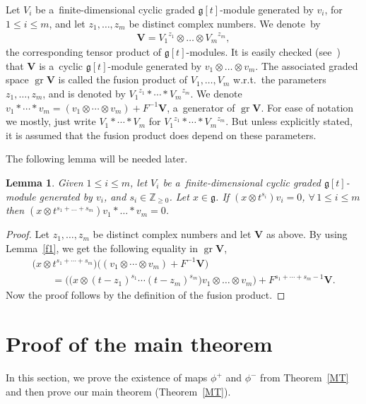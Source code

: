 \documentclass[11pt]{article}
\newtheorem{lemma}{Lemma}
\DeclareMathOperator{\gr}{gr}
\numberwithin{equation}{section}
\begin{document}
Let $V_i$ be a~f\/inite-dimensional cyclic graded $\mathfrak{g}[t]$-module generated by $v_i$, for $1\leq i\leq m$, and
let $z_1,\dots,z_m$ be distinct complex numbers.
We denote~by
\begin{gather*}
\mathbf{V}={V_1}^{z_1}\otimes\dots\otimes {V_m}^{z_m},
\end{gather*}
the corresponding tensor product of $\mathfrak{g}[t]$-modules.
It is easily checked (see~\cite[Proposition 1.4]{FL}) that $\mathbf{V}$ is a~cyclic $\mathfrak{g}[t]$-module generated
by $v_1\otimes\dots\otimes v_m$.
The associated graded space $\gr \mathbf{V}$ is called the fusion product of $V_1,\dots,V_m$ w.r.t.\ the parameters
$z_1,\dots,z_m$, and is denoted by ${V_1}^{z_1}*\cdots*{V_m}^{z_m}$.
We denote $v_1*\cdots*v_m=(v_1\otimes\cdots\otimes v_m)+F^{-1}\mathbf{V}$, a~generator of $\gr \mathbf{V}$.
For ease of notation we mostly, just write $V_1*\cdots*V_m$ for ${V_1}^{z_1}*\cdots*{V_m}^{z_m}$.
But unless explicitly stated, it is assumed that the fusion product does depend on these parameters.

The following lemma will be needed later.
\begin{lemma}
\label{f2}
Given $1\leq i\leq m$, let $V_i$ be a~finite-dimensional cyclic graded $\mathfrak{g}[t]$-module generated by $v_i$, and
$s_i\in\mathbb{Z}_{\geq0}$.
Let $x\in\mathfrak{g}$.
If $(x\otimes t^{s_i})v_i=0$, $\forall\, 1\leq i\leq m$ then $(x\otimes t^{s_1+\dots+s_m}) v_1*\dots*v_m=0$.
\end{lemma}
\begin{proof}
Let $z_1,\dots,z_m$ be distinct complex numbers and let $\mathbf{V}$ as above.
By using Lemma~\ref{f1}, we get the following equality in $\gr \mathbf{V}$,
\begin{gather*}
\big(x\otimes t^{s_1+\cdots+s_m}\big) \big((v_1\otimes\cdots\otimes v_m)+F^{-1}\mathbf{V}\big)
\\
\qquad{}
=\big(\big(x\otimes (t-z_1)^{s_1}\cdots(t-z_m)^{s_m}\big)v_1\otimes\dots\otimes v_m\big) + F^{s_1+\cdots+s_m-1}\mathbf{V}.
\end{gather*}
Now the proof follows by the def\/inition of the fusion product.
\end{proof}

\section{Proof of the main theorem}\label{section4}

In this section, we prove the existence of maps $\phi^{+}$ and $\phi^{-}$ from Theorem~\ref{MT} and then prove our main
theorem (Theorem~\ref{MT}).
\end{document}

